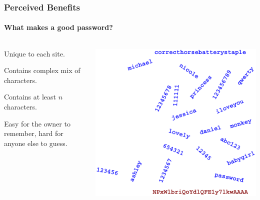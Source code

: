 \documentclass[handout, notes=hide]{beamer}
\begin{document}
\begin{frame}
\frametitle{Perceived Benefits}
\framesubtitle{What makes a good password?}
\setlength{\parskip}{0.5em}

\vspace{+2.0em}

\begin{columns}[T]
\begin{column}[T]{0.6\textwidth}
\setlength{\parskip}{0.5em}

Unique to each site.

Contains complex mix of characters.

Contains at least $n$ characters.

Easy for the owner to remember, hard for anyone else to guess.

\end{column}
\begin{column}[T]{0.4\textwidth}
\vspace{-3.0em}
\hspace{-7.0em}
\includegraphics[width=1.6\textwidth]{rockyou}
\end{column}
\end{columns}

\end{frame}
\note{
\setlength{\parskip}{0.5em}
}

\end{document}
